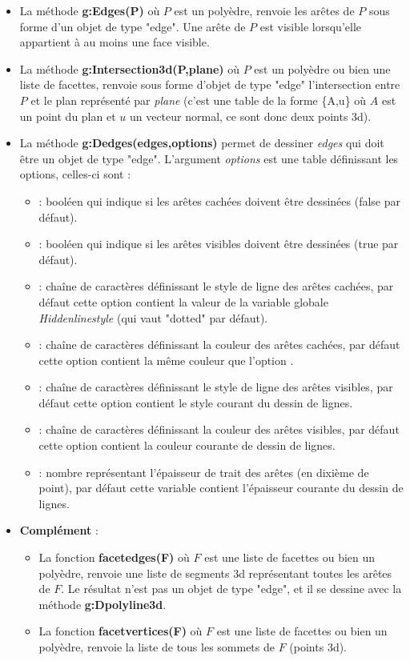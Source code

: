 \begin{itemize}
    \item La méthode \textbf{g:Edges(P)} où $P$ est un polyèdre, renvoie les arêtes de $P$ sous forme d'un objet de type "edge". Une arête de $P$ est visible lorsqu'elle appartient à au moins une face visible.
    \item La méthode \textbf{g:Intersection3d(P,plane)} où $P$ est un polyèdre ou bien une liste de facettes, renvoie sous forme d'objet de type "edge" l'intersection entre $P$ et le plan représenté par \emph{plane} (c'est une table de la forme \{A,u\} où $A$ est un point du plan et $u$ un vecteur normal, ce sont donc deux points 3d).
    \item La méthode \textbf{g:Dedges(edges,options)} permet de dessiner \emph{edges} qui doit être un objet de type "edge". L'argument \emph{options} est une table définissant les options, celles-ci sont :
    \begin{itemize}
        \item {} : booléen qui indique si les arêtes cachées doivent être dessinées (false par défaut).
        \item {} : booléen qui indique si les arêtes visibles doivent être dessinées (true par défaut).
        \item {} : chaîne de caractères définissant le style de ligne des arêtes cachées, par défaut cette option contient la valeur de la variable globale \emph{Hiddenlinestyle} (qui vaut "dotted" par défaut).
        \item {} : chaîne de caractères définissant la couleur des arêtes cachées, par défaut cette option contient la même couleur que l'option .
        \item {} : chaîne de caractères définissant le style de ligne des arêtes visibles, par défaut cette option contient le style courant du dessin de lignes.
        \item {} : chaîne de caractères définissant la couleur des arêtes visibles, par défaut cette option contient la couleur courante de dessin de lignes.
        \item {} : nombre représentant l'épaisseur de trait des arêtes (en dixième de point), par défaut cette variable contient l'épaisseur courante du dessin de lignes.
    \end{itemize}

    \item \textbf{Complément} : 
        \begin{itemize}
            \item La fonction \textbf{facetedges(F)} où $F$ est une liste de facettes ou bien un polyèdre, renvoie une liste de segments 3d représentant toutes les arêtes de $F$. Le résultat n'est pas un objet de type "edge", et il se dessine avec la méthode \textbf{g:Dpolyline3d}.
            \item La fonction \textbf{facetvertices(F)} où $F$ est une liste de facettes ou bien un polyèdre, renvoie la liste de tous les sommets de $F$ (points 3d).
        \end{itemize}
\end{itemize}

